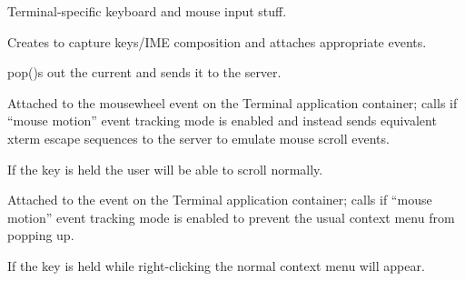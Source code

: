 \documentclass[letterpaper,10pt,openany]{sphinxmanual}
\begin{document}
\begin{fulllineitems}
\label{Applications/terminal/js_terminal_input:GateOne.Terminal.Input}
Terminal-specific keyboard and mouse input stuff.


\begin{fulllineitems}
\label{Applications/terminal/js_terminal_input:GateOne.Terminal.Input.init}
Creates  to capture keys/IME composition and attaches appropriate events.

\end{fulllineitems}



\begin{fulllineitems}
\label{Applications/terminal/js_terminal_input:GateOne.Terminal.Input.sendChars}
pop()s out the current  and sends it to the server.

\end{fulllineitems}



\begin{fulllineitems}
\label{Applications/terminal/js_terminal_input:GateOne.Terminal.Input.onMouseWheel}
Attached to the mousewheel event on the Terminal application container; calls  if ``mouse motion'' event tracking mode is enabled and instead sends equivalent xterm escape sequences to the server to emulate mouse scroll events.

If the  key is held the user will be able to scroll normally.

\end{fulllineitems}



\begin{fulllineitems}
\label{Applications/terminal/js_terminal_input:GateOne.Terminal.Input.onMouseMove}
Attached to the  event on the Terminal application container; calls  if ``mouse motion'' event tracking mode is enabled to prevent the usual context menu from popping up.

If the  key is held while right-clicking the normal context menu will appear.


\end{fulllineitems}
\end{fulllineitems}
\end{document}
